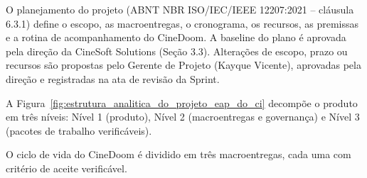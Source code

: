 


O planejamento do projeto (ABNT NBR ISO/IEC/IEEE 12207:2021 – cláusula 6.3.1) define o escopo, as macroentregas, o cronograma, os recursos, as premissas e a rotina de acompanhamento do CineDoom. A baseline do plano é aprovada pela direção da CineSoft Solutions (Seção 3.3). Alterações de escopo, prazo ou recursos são propostas pelo Gerente de Projeto (Kayque Vicente), aprovadas pela direção e registradas na ata de revisão da Sprint.


A Figura~\ref{fig:estrutura_analitica_do_projeto_eap_do_ci} decompõe o produto em três níveis: Nível 1 (produto), Nível 2 (macroentregas e governança) e Nível 3 (pacotes de trabalho verificáveis).



O ciclo de vida do CineDoom é dividido em três macroentregas, cada uma com critério de aceite verificável.


